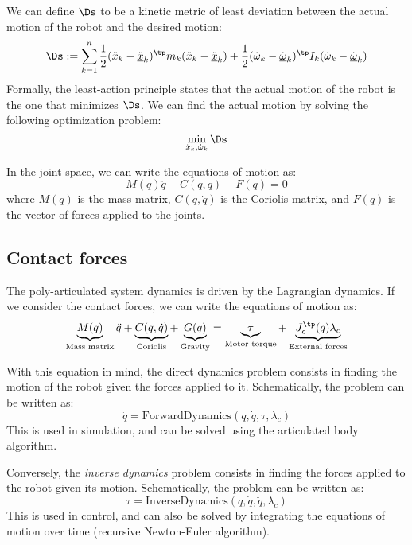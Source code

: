 We can define $\Ds$ to be a kinetic metric of least deviation between the actual motion of the robot and the desired motion:
\begin{equation}
    \Ds := \sum_{k=1}^n \frac{1}{2}(\ddot{x}_k - \underline{\ddot{x}}_k)^\tp m_k (\ddot{x}_k - \underline{\ddot{x}}_k) + \frac{1}{2}(\dot{\omega}_k - \underline{\dot{\omega}}_k)^\tp I_k (\dot{\omega}_k - \underline{\dot{\omega}}_k)
\end{equation}
Formally, the least-action principle states that the actual motion of the robot is the one that minimizes $\Ds$. We can find the actual motion by solving the following optimization problem:
\begin{equation}
    \min_{\ddot{x}_k, \dot{\omega}_k} \Ds
\end{equation}

In the joint space, we can write the equations of motion as:
\begin{equation}
    M(q)\ddot{q} + C(q, \dot{q}) - F(q) = 0
\end{equation}
where $M(q)$ is the mass matrix, $C(q, \dot{q})$ is the Coriolis matrix, and $F(q)$ is the vector of forces applied to the joints.

\subsection{Contact forces}
The poly-articulated system dynamics is driven by the Lagrangian dynamics. If we consider the contact forces, we can write the equations of motion as:
\begin{equation*}
    \underbrace{M(q)}_{\text{Mass matrix}}\ddot{q} + \underbrace{C(q, \dot{q})}_{\text{Coriolis}} + \underbrace{G(q)}_{\text{Gravity}} = \underbrace{\tau}_{\text{Motor torque}} + \underbrace{J_c^\tp(q)\lambda_c}_{\text{External forces}}
\end{equation*}

With this equation in mind, the direct dynamics problem consists in finding the motion of the robot given the forces applied to it. Schematically, the problem can be written as:
\begin{equation*}
    \ddot{q} = \text{ForwardDynamics}(q, \dot{q}, \tau, \lambda_c)
\end{equation*}
This is used in simulation, and can be solved using the articulated body algorithm.

Conversely, the \emph{inverse dynamics} problem consists in finding the forces applied to the robot given its motion. Schematically, the problem can be written as:
\begin{equation*}
    \tau = \text{InverseDynamics}(q, \dot{q}, \ddot{q}, \lambda_c)
\end{equation*}
This is used in control, and can also be solved by integrating the equations of motion over time (recursive Newton-Euler algorithm).

